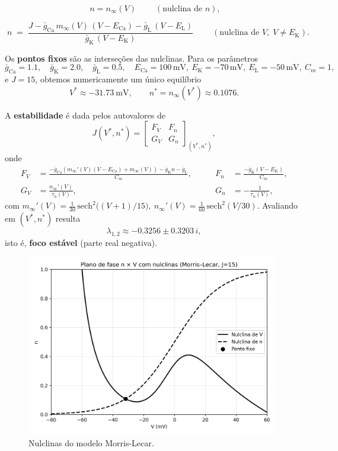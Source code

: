\documentclass[english,11pt,a4paper]{article}
\begin{document}
	\[
	\boxed{\; n = n_\infty(V) \;} \qquad (\text{nulclina de }n),
	\]
	
	\[
	\boxed{\;
		n \;=\; \dfrac{J - \bar g_{\mathrm{Ca}}\,m_\infty(V)\,(V-E_{\mathrm{Ca}})
			- \bar g_{\mathrm L}\,(V-E_{\mathrm L})}
		{\bar g_{\mathrm K}\,(V-E_{\mathrm K})}
		\;}\qquad (\text{nulclina de }V,\; V\neq E_{\mathrm K}).
	\]
	
	\medskip
	Os \textbf{pontos fixos} são as interseções das nulclinas. Para os parâmetros
	\[
	\bar g_{\mathrm{Ca}}=1.1,\quad \bar g_{\mathrm K}=2.0,\quad \bar g_{\mathrm L}=0.5,\quad
	E_{\mathrm{Ca}}=100\,\mathrm{mV},\ E_{\mathrm K}=-70\,\mathrm{mV},\ E_{\mathrm L}=-50\,\mathrm{mV},\ 
	C_m=1,
	\]
	e $J=15$, obtemos numericamente um único equilíbrio
	\[
	\boxed{\; V^\ast \approx -31.73\ \mathrm{mV},\qquad n^\ast = n_\infty(V^\ast)\approx 0.1076.\;}
	\]
	
	\noindent A \textbf{estabilidade} é dada pelos autovalores de
	\[
	J(V^\ast,n^\ast)=
	\begin{bmatrix}
		F_V & F_n\\ G_V & G_n
	\end{bmatrix}_{(V^\ast,n^\ast)},
	\]
	onde
	\[
	\begin{aligned}
		F_V &= \frac{-\bar g_{\mathrm{Ca}}\!\left(m_\infty'(V)(V-E_{\mathrm{Ca}})+m_\infty(V)\right)-\bar g_{\mathrm K}n-\bar g_{\mathrm L}}{C_m},\qquad
		&F_n &= \frac{-\bar g_{\mathrm K}(V-E_{\mathrm K})}{C_m},\\[4pt]
		G_V &= \frac{n_\infty'(V)}{\tau_n(V)},\qquad
		&G_n &= -\frac{1}{\tau_n(V)},
	\end{aligned}
	\]
	com
	\(
	m_\infty'(V)=\tfrac{1}{30}\,\mathrm{sech}^2\!\big((V+1)/15\big),\ 
	n_\infty'(V)=\tfrac{1}{60}\,\mathrm{sech}^2\!(V/30).
	\)
	Avaliando em $(V^\ast,n^\ast)$ resulta
	\[
	\lambda_{1,2}\approx -0.3256 \pm 0.3203\,i,
	\]
	isto é, \textbf{foco estável} (parte real negativa).
	
	\begin{figure}[H]
		\centering
		\includegraphics[width=11cm]{../figures/ex_2a.png}
		\caption{Nulclinas do modelo Morris-Lecar.}
	\end{figure}
	
\end{document}

